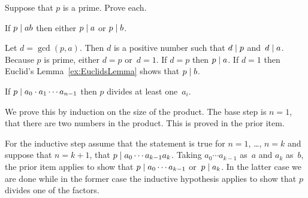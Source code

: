 \documentclass{ibl}  %
\begin{document}
\begin{problem} 
Suppose that $p$ is a prime.  Prove each.\label{ex:EuclidsOtherLemma}
\begin{exes}
\begin{exercise} 
  If  $p\mid ab$ then either $p\mid a$ or $p\mid b$.
\end{exercise}
\begin{answer}
  Let $d=\gcd(p,a)$.
  Then $d$ is a positive number such that $d\mid p$ and~$d\mid a$.
  Because $p$ is prime, either $d=p$ or~$d=1$.
  If $d=p$ then $p\mid a$.
  If $d=1$ then Euclid's Lemma~\ref{ex:EuclidsLemma} shows that 
  $p\mid b$.
\end{answer}
\begin{exercise} 
  If $p\mid a_0\cdot a_1\cdots a_{n-1}$ then $p$ divides at least one~$a_i$.
\end{exercise}
\begin{answer}
  We prove this by induction on the size of the product.
  The base step is $n=1$, that there are two numbers in the product.
  This is proved in the prior item.

  For the inductive step assume that the statement is true for $n=1$, \ldots,
  $n=k$ and suppose that $n=k+1$, that $p\mid a_0\cdots a_{k-1}a_k$.
  Taking $a_0\cdots a_{k-1}$ as~$a$ and $a_k$ as~$b$, the prior item applies
  to show that $p\mid a_0\cdots a_{k-1}$ or~$p\mid a_k$.
  In the latter case we are done while in the former case the
  inductive hypothesis applies to show that $p$ divides one of the factors.  
\end{answer}
\end{exes}

\end{problem}
\end{document}
